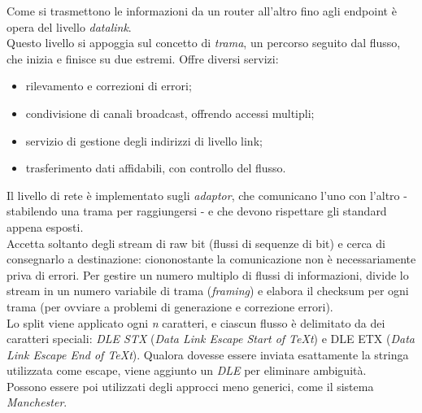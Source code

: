 Come si trasmettono le informazioni da un router all'altro fino agli endpoint è opera del livello \textit{datalink}. \\
Questo livello si appoggia sul concetto di \textit{trama}, un percorso seguito dal flusso, che inizia e finisce su due estremi. Offre diversi servizi:
\begin{itemize}
	\item rilevamento e correzioni di errori;
	\item condivisione di canali broadcast, offrendo accessi multipli;
	\item servizio di gestione degli indirizzi di livello link;
	\item trasferimento dati affidabili, con controllo del flusso.
\end{itemize}
Il livello di rete è implementato sugli \textit{adaptor}, che comunicano l'uno con l'altro - stabilendo una trama per raggiungersi - e che devono rispettare gli standard appena esposti. \\
Accetta soltanto degli stream di raw bit (flussi di sequenze di bit) e cerca di consegnarlo a destinazione: ciononostante la comunicazione non è necessariamente priva di errori. Per gestire un numero multiplo di flussi di informazioni, divide lo stream in un numero variabile di trama (\textit{framing}) e elabora il checksum per ogni trama (per ovviare a problemi di generazione e correzione errori). \\
Lo split viene applicato ogni \textit{n} caratteri, e ciascun flusso è delimitato da dei caratteri speciali: \textit{DLE STX} (\textit{Data Link Escape Start of TeXt}) e DLE ETX (\textit{Data Link Escape End of TeXt}). Qualora dovesse essere inviata esattamente la stringa utilizzata come escape, viene aggiunto un \textit{DLE} per eliminare ambiguità. \\
Possono essere poi utilizzati degli approcci meno generici, come il sistema \textit{Manchester}.

